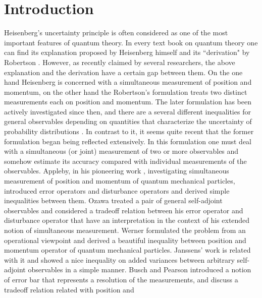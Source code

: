 \documentclass[showpacs,preprintnumbers,amsmath,amssymb]{revtex4}
\begin{document}
\section{Introduction}
Heisenberg's uncertainty principle is often considered as 
one of the most important features of quantum theory. 
In every text book on quantum theory one can find 
its explanation proposed by 
Heisenberg himself \cite{Heisenberg} 
and its ``derivation" by Robertson \cite{Robertson}.  
However, as recently claimed by several researchers, 
the above explanation and the derivation have 
a certain gap between them. On the one hand 
Heisenberg is concerned with a simultaneous measurement
of position and momentum, on the other hand the Robertson's
formulation treats two distinct measurements each on position and 
momentum. 
The later formulation has been actively investigated 
since then, and there are a several different inequalities
for general observables 
depending on quantities that characterize the 
uncertainty of probability distributions
\cite{LP,Deutsch,Maassen,KP,Miyadera}.  
In contrast to it, it seems quite recent that 
the former formulation began being
reflected extensively. In this formulation
one must deal with a simultaneous (or joint) measurement of two 
or more observables and somehow estimate its 
accuracy compared with 
individual measurements of the observables. 
Appleby, in his pioneering work \cite{Appleby}, 
investigating simultaneous measurement of 
position and momentum of quantum mechanical particles, 
introduced error operators 
and disturbance operators and derived 
simple inequalities between them. 
 Ozawa \cite{Ozawa} treated a pair of general 
 self-adjoint observables and 
 considered a tradeoff relation between his 
 error operator and disturbance operator that have 
 an interpretation in the context of his extended notion of 
 simultaneous measurement. 
 Werner \cite{Werner} formulated the problem from an operational viewpoint 
 and derived a beautiful inequality between 
 position and momentum operator of quantum mechanical particles.
 Janssens' work \cite{Janssens} is related with it and 
 showed a nice inequality on added variances 
 between arbitrary 
 self-adjoint observables in a simple manner.   
 Busch and Pearson \cite{errorbar} introduced a notion of 
 error bar that represents a resolution of the measurements, and 
 discuss a tradeoff relation related with position and 
\end{document}
